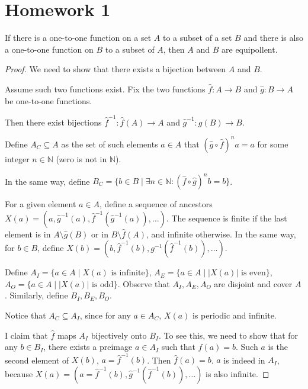 \section{Homework 1}

\begin{theorem}
    If there is a one-to-one function on a set $A$ to a subset of a set $B$ and there is also a one-to-one function on $B$ to a subset of $A$, then $A$ and $B$ are equipollent.
\end{theorem}
\begin{proof}
    We need to show that there exists a bijection between $A$ and $B$.

    Assume such two functions exist. Fix the two functions $\widehat{f} : A \to B$ and $\widehat{g} : B \to A$ be one-to-one functions.

    Then there exist bijections $\widehat{f}^{-1} : \widehat{f}(A) \to A$ and $\widehat{g}^{-1} : g(B) \to B$.

    Define $A_C \subseteq A$ as the set of such elements $a \in A$ that $(\widehat{g} \circ \widehat{f})^n a = a$ for some integer $n \in \mathbb{N}$ (zero is not in $\mathbb{N}$). 
    
    In the same way, define $B_C = \{b \in B \; | \; \exists n \in \mathbb{N} : (\widehat{f} \circ \widehat{g})^n b = b\}$.

    For a given element $a \in A$, define a sequence of ancestors $X(a) = (a, \widehat{g}^{-1}(a), \widehat{f}^{-1}(\widehat{g}^{-1}(a)), \ldots)$. The sequence is finite if the last element is in $A \setminus \widehat{g}(B)$ or in $B \setminus \widehat{f}(A)$, and infinite otherwise. In the same way, for $b \in B$, define $X(b) = (b, \widehat{f}^{-1}(b), g^{-1}(\widehat{f}^{-1}(b)), \ldots)$.

    Define $A_I = \{a \in A \; | \; X(a) \text{ is infinite}\}$, $A_E = \{a \in A \; | \; |X(a)| \text{ is even}\}$, $A_O = \{a \in A \; | \; |X(a)| \text{ is odd}\}$. Observe that $A_I, A_E, A_O$ are disjoint and cover $A$. Similarly, define $B_I, B_E, B_O$.

    Notice that $A_C \subseteq A_I$, since for any $a \in A_C$, $X(a)$ is periodic and infinite.

    I claim that $\widehat{f}$ maps $A_I$ bijectively onto $B_I$. To see this, we need to show that for any $b \in B_I$, there exists a preimage $a \in A_I$ such that $\widehat{f}(a) = b$. Such $a$ is the second element of $X(b)$, $a = \widehat{f}^{-1}(b)$. Then $\widehat{f}(a) = b$. $a$ is indeed in $A_I$, because $X(a) = (a = \widehat{f}^{-1}(b), \widehat{g}^{-1}(\widehat{f}^{-1}(b)), \ldots)$ is also infinite.


\end{proof}
